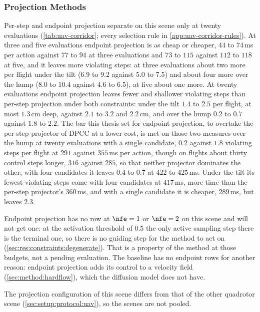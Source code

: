 \subsubsection{Projection Methods}\label{sec:res:uav:projection}
Per-step and endpoint projection separate on this scene only at twenty evaluations
(\autoref{tab:uav-corridor}; every selection rule in \autoref{app:uav-corridor-rules}). At three and five
evaluations endpoint projection is as cheap or cheaper, $44$ to $74$\,ms per action against $77$ to $94$ at
three evaluations and $73$ to $115$ against $112$ to $118$ at five, and it leaves more violating steps: at
three evaluations about two more per flight under the tilt ($6.9$ to $9.2$ against $5.0$ to $7.5$) and about
four more over the hump ($8.0$ to $10.4$ against $4.6$ to $6.5$), at five about one more. At twenty
evaluations endpoint projection leaves fewer and shallower violating steps than per-step projection under
both constraints: under the tilt $1.4$ to $2.5$ per flight, at most $1.3$\,cm deep, against $2.1$ to $3.2$
and $2.2$\,cm, and over the hump $0.2$ to $0.7$ against $1.8$ to $2.2$. The bar this thesis set for endpoint
projection, to overtake the per-step projector of \ac{DPCC} at a lower cost, is met on those two measures over
the hump at twenty evaluations with a single candidate, $0.2$ against $1.8$ violating steps per flight at $291$
against $355$\,ms per action, though on flights about thirty control steps longer, $316$ against $285$, so that
neither projector dominates the other; with four candidates it leaves $0.4$ to $0.7$ at $422$ to $425$\,ms. Under the tilt
its fewest violating steps come with four candidates at $417$\,ms, more time than the per-step projector's
$360$\,ms, and with a single candidate it is cheaper, $289$\,ms, but leaves $2.3$.

Endpoint projection has no row at $\nfe=1$ or $\nfe=2$ on this scene and will not get one: at the
activation threshold of $0.5$ the only active sampling step there is the terminal one, so there is no
guiding step for the method to act on (\autoref{sec:res:constraints:degenerate}). That is a property of
the method at those budgets, not a pending evaluation. The baseline has no endpoint rows for another
reason: endpoint projection adds its control to a velocity field (\autoref{sec:method:hardflow}), which
the diffusion model does not have.

The projection configuration of this scene differs from that of the other quadrotor scene
(\autoref{sec:setup:protocol:uav}), so the scenes are not pooled.

